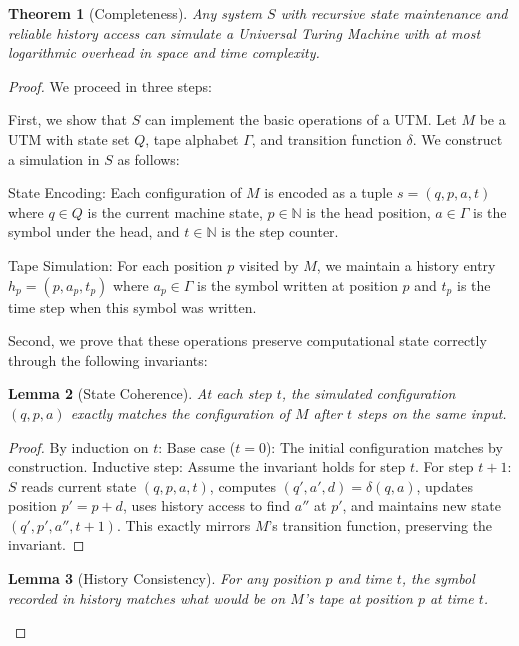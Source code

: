 \documentclass[12pt]{article}
\newtheorem{theorem}{Theorem}
\newtheorem{lemma}[theorem]{Lemma}
\begin{document}
\begin{theorem}[Completeness]
Any system $S$ with recursive state maintenance and reliable history access can simulate a Universal Turing Machine with at most logarithmic overhead in space and time complexity.
\end{theorem}

\begin{proof}
We proceed in three steps:

First, we show that $S$ can implement the basic operations of a UTM. Let $M$ be a UTM with state set $Q$, tape alphabet $\Gamma$, and transition function $\delta$. We construct a simulation in $S$ as follows:

State Encoding: Each configuration of $M$ is encoded as a tuple $s = (q, p, a, t)$ where $q \in Q$ is the current machine state, $p \in \mathbb{N}$ is the head position, $a \in \Gamma$ is the symbol under the head, and $t \in \mathbb{N}$ is the step counter.

Tape Simulation: For each position $p$ visited by $M$, we maintain a history entry $h_p = (p, a_p, t_p)$ where $a_p \in \Gamma$ is the symbol written at position $p$ and $t_p$ is the time step when this symbol was written.

Second, we prove that these operations preserve computational state correctly through the following invariants:

\begin{lemma}[State Coherence]
At each step $t$, the simulated configuration $(q, p, a)$ exactly matches the configuration of $M$ after $t$ steps on the same input.
\end{lemma}

\begin{proof}
By induction on $t$:
Base case ($t=0$): The initial configuration matches by construction.
Inductive step: Assume the invariant holds for step $t$. For step $t+1$: $S$ reads current state $(q, p, a, t)$, computes $(q', a', d) = \delta(q, a)$, updates position $p' = p + d$, uses history access to find $a''$ at $p'$, and maintains new state $(q', p', a'', t+1)$. This exactly mirrors $M$'s transition function, preserving the invariant.
\end{proof}

\begin{lemma}[History Consistency]
For any position $p$ and time $t$, the symbol recorded in history matches what would be on $M$'s tape at position $p$ at time $t$.
\end{lemma}


\end{proof}
\end{document}
